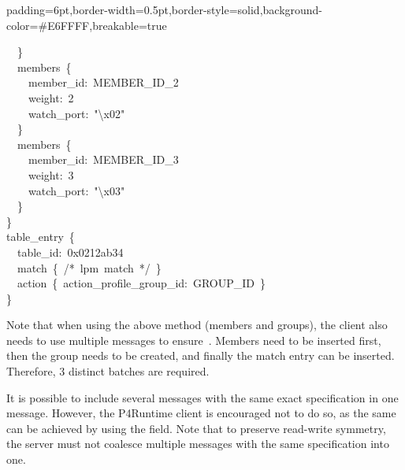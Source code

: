 \documentclass[11pt]{article}
\begin{document}
{\begin{mdbmargintb}{6pt}{6pt}
\begin{mdblock}{padding=6pt,border-width=0.5pt,border-style=solid,background-color=\#E6FFFF,breakable=true}
\begin{mdpre}
{{~~\}\\
~~members~\{\\
~~~~member\_id:~MEMBER\_ID\_2\\
~~~~weight:~{2}\\
~~~~watch\_port:~{"}{\textbackslash{}x02}{"}\\
~~\}\\
~~members~\{\\
~~~~member\_id:~MEMBER\_ID\_3\\
~~~~weight:~{3}\\
~~~~watch\_port:~{"}{\textbackslash{}x03}{"}\\
~~\}\\
\}\\
table\_entry~\{\\
~~table\_id:~{0x0212ab34}\\
~~match~\{~/*~lpm~match~*/~\}\\
~~action~\{~action\_profile\_group\_id:~GROUP\_ID~\}\\
\}}}%
\end{mdpre}%
\end{mdblock}%
\end{mdbmargintb}%

\noindent{}Note that when using the above method (members and groups), the client also
needs to use multiple messages to ensure~. Members need to be inserted
first, then the group needs to be created, and finally the match entry can be
inserted. Therefore, 3 distinct  batches are required.%

It is possible to include several  messages with the same
exact  specification in one  message. However,
the P4Runtime client is encouraged not to do so, as the same can be achieved by
using the  field. Note that to preserve read-write symmetry, the server
must not coalesce multiple  messages with the same 
specification into one.%

}
\end{document}
